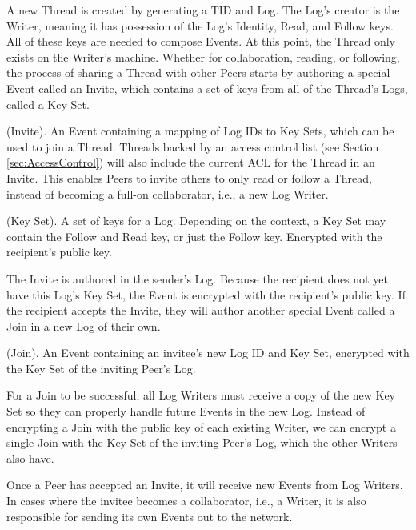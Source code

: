 \documentclass{comjnl}
\begin{document}
A new Thread is created by generating a TID and Log. The Log’s creator is the Writer, meaning it has possession of the Log’s Identity, Read, and Follow keys. All of these keys are needed to compose Events. At this point, the Thread only exists on the Writer’s machine. Whether for collaboration, reading, or following, the process of sharing a Thread with other Peers starts by authoring a special Event called an Invite, which contains a set of keys from all of the Thread’s Logs, called a Key Set.

\begin{definition}
(Invite). An Event containing a mapping of Log IDs to Key Sets, which can be used to join a Thread. Threads backed by an access control list (see Section  \ref{sec:AccessControl}) will also include the current ACL for the Thread in an Invite. This enables Peers to invite others to only read or follow a Thread, instead of becoming a full-on collaborator, i.e., a new Log Writer.
\end{definition}

\begin{definition}
(Key Set). A set of keys for a Log. Depending on the context, a Key Set may contain the Follow and Read key, or just the Follow key. Encrypted with the recipient’s public key.
\end{definition}

The Invite is authored in the sender’s Log. Because the recipient does not yet have this Log’s Key Set, the Event is encrypted with the recipient’s public key. If the recipient accepts the Invite, they will author another special Event called a Join in a new Log of their own.

\begin{definition}
(Join). An Event containing an invitee’s new Log ID and Key Set, encrypted with the Key Set of the inviting Peer’s Log.
\end{definition}

For a Join to be successful, all Log Writers must receive a copy of the new Key Set so they can properly handle future Events in the new Log. Instead of encrypting a Join with the public key of each existing Writer, we can encrypt a single Join with the Key Set of the inviting Peer’s Log, which the other Writers also have.

Once a Peer has accepted an Invite, it will receive new Events from Log Writers. In cases where the invitee becomes a collaborator, i.e., a Writer, it is also responsible for sending its own Events out to the network.\\
\end{document}

